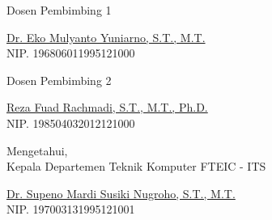   \begin{center}
  
    \begin{multicols}{2}
  
      Dosen Pembimbing 1
      \vspace{12ex}
  
      \underline{Dr. Eko Mulyanto Yuniarno, S.T., M.T.} \\
      NIP. 196806011995121000
  
      \columnbreak
  
      Dosen Pembimbing 2
      \vspace{12ex}
  
      \underline{Reza Fuad Rachmadi, S.T., M.T., Ph.D.} \\
      NIP. 198504032012121000
  
    \end{multicols}
    \vspace{6ex}
  
    Mengetahui, \\
    Kepala Departemen Teknik Komputer FTEIC - ITS
    \vspace{12ex}
  
    \underline{Dr. Supeno Mardi Susiki Nugroho, S.T., M.T.} \\
    NIP. 197003131995121001
  
  \end{center}